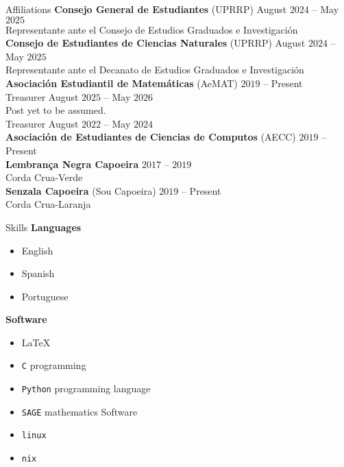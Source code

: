 \documentclass{resume}
\begin{document}
\begin{rSection}{Affiliations}
  \textbf{Consejo General de Estudiantes} (UPRRP)
            \hfill August $2024$ -- May $2025$  \\
  Representante ante el Consejo de Estudios Graduados e
  Investigaci\'on \\

  \textbf{Consejo de Estudiantes de Ciencias Naturales} (UPRRP)
            \hfill August $2024$ -- May $2025$  \\
  Representante ante el Decanato de Estudios Graduados e
  Investigaci\'on \\

  \textbf{Asociaci\'on Estudiantil de Matem\'aticas} (AeMAT)
            \hfill $2019$ -- Present \medskip \\
    Treasurer \hfill August $2025$ -- May $2026$ \\
    {\footnotesize Post yet to be assumed}.  \medskip \\
    Treasurer \hfill August $2022$ -- May $2024$ \\

  \textbf{Asociaci\'on de Estudiantes de Ciencias de Computos} (AECC)
            \hfill $2019$ --  Present \\

  \textbf{Lembran\c{c}a Negra Capoeira} \hfill $2017$ -- $2019$ \\
  Corda Crua-Verde  \\

  \textbf{Senzala Capoeira} (Sou Capoeira) \hfill $2019$ -- Present \\
  Corda Crua-Laranja  \\

\end{rSection}

\begin{rSection}{Skills}
  \textbf{Languages}
  \begin{itemize}
    \item[] English

    \item[] Spanish

    \item[] Portuguese
  \end{itemize}

  \textbf{Software}
  \begin{itemize}
    \item[] \LaTeX

    \item[] \lstinline{C} programming

    \item[] \lstinline{Python} programming language

    \item[] \lstinline{SAGE} mathematics Software

    \item[] \lstinline{linux}

    \item[] \lstinline{nix}
  \end{itemize}
\end{rSection}
\end{document}
